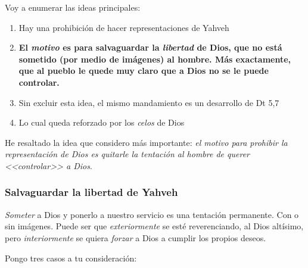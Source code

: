 \documentclass{article}
\begin{document}
\noindent
Voy a enumerar las ideas principales:

\begin{enumerate}
\item Hay una prohibici\'on de hacer representaciones de Yahveh
\item \textbf{El \emph{motivo} es para salvaguardar la \emph{libertad} de Dios, que no est\'a sometido (por medio de im\'agenes) al hombre. M\'as exactamente, que al pueblo le quede muy claro que a Dios no se le puede controlar.}
\item Sin excluir esta idea, el mismo mandamiento es un desarrollo de Dt 5,7
\item Lo cual queda reforzado por los \emph{celos} de Dios
\end{enumerate}

\noindent
He resaltado la idea que considero m\'as importante: \emph{el motivo para prohibir la representaci\'on de Dios es quitarle la tentaci\'on al hombre de querer <<controlar>> a Dios}.



\subsubsection{Salvaguardar la libertad de Yahveh}

\emph{Someter} a Dios y ponerlo a nuestro servicio es una tentaci\'on permanente. Con o sin im\'agenes. Puede ser que \emph{exteriormente} se est\'e reverenciando, al Dios alt\'{i}simo, pero \emph{interiormente} se quiera \emph{forzar} a Dios a cumplir los propios deseos.

Pongo tres casos a tu consideraci\'on:
\end{document}
